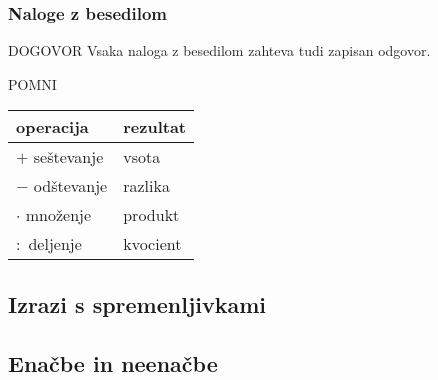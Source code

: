         \begin{frame}[t]
            \frametitle{Naloge z besedilom}

            \begin{exampleblock}{DOGOVOR}
                Vsaka naloga z besedilom zahteva tudi zapisan odgovor.
            \end{exampleblock}

            \begin{block}{POMNI}
                \begin{tabular}{|l|l|}
                    \hline 
                    operacija & rezultat \\
                    \hline \hline
                    $+$ seštevanje & vsota \\
                    \hline
                    $-$ odštevanje & razlika \\
                    \hline
                    $\cdot$ množenje & produkt \\
                    \hline
                    $:$ deljenje & kvocient \\
                    \hline 
                    
                \end{tabular}
            \end{block}
        \end{frame}

    \subsection{Izrazi s spremenljivkami}
        

    \subsection{Enačbe in neenačbe}
        


